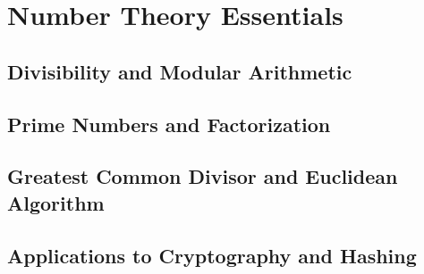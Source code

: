 \section{Number Theory Essentials}
\subsection{Divisibility and Modular Arithmetic}
\subsection{Prime Numbers and Factorization}
\subsection{Greatest Common Divisor and Euclidean Algorithm}
\subsection{Applications to Cryptography and Hashing}